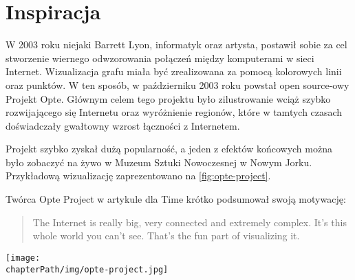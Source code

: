 \section{Inspiracja}
W 2003 roku niejaki Barrett Lyon, informatyk oraz artysta, postawił sobie za cel stworzenie wiernego odwzorowania połączeń między komputerami w sieci Internet. Wizualizacja grafu miała być zrealizowana za pomocą kolorowych linii oraz punktów. W ten sposób, w październiku 2003 roku powstał open source-owy Projekt Opte. Głównym celem tego projektu było zilustrowanie wciąż szybko rozwijającego się Internetu oraz wyróżnienie regionów, które w tamtych czasach doświadczały gwałtowny wzrost łączności z Internetem.

Projekt szybko zyskał dużą popularność, a jeden z efektów końcowych można było zobaczyć na żywo w Muzeum Sztuki Nowoczesnej w Nowym Jorku. Przykładową wizualizację zaprezentowano na \ref{fig:opte-project}.

Twórca Opte Project w artykule dla Time \cite{OpteProject:Time} krótko podsumował swoją motywację:

\begin{center}

\hyphenblockcquote{USenglish}{OpteProject:Time}{
	The Internet is really big, very connected and extremely complex. \linebreak
	It’s this whole world you can’t see. That’s the fun part of visualizing it.
}
\end{center}


\begin{figure*}[!h]
	\begin{center}
		\texttt{[image: \\chapterPath/img/opte-project.jpg]}
		\caption{Jedna z wizualizacji stworzona przez Opte Project}
		\label{fig:opte-project}
	\end{center}
\end{figure*}
